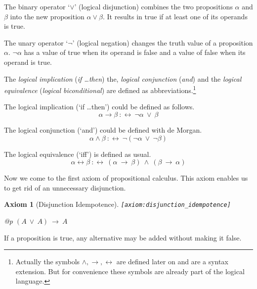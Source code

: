 \documentclass[a4paper,german,10pt,twoside]{book}
\newtheorem{ax}{Axiom}
\theoremstyle{definition}
\theoremstyle{remark}
\begin{document}
The binary operator \mbox{`$\vee$'} (logical disjunction) combines the two propositions $\alpha$ and $\beta$ into the new proposition $\alpha \vee \beta$. It results in true if at least one of its operands is true.

\par
The unary operator \mbox{`$\neg$'} (logical negation) changes the truth value of a proposition $\alpha$. $\neg \alpha$ has a value of true when its operand is false and a value of false when its operand is true. 

\par
The \emph{logical implication} (\emph{if \ldots then}) the, \emph{logical conjunction} (\emph{and}) and the \emph{logical equivalence} (\emph{logical biconditional}) are defined as abbreviations.\footnote{Actually the symbols $\wedge, \rightarrow, 
\leftrightarrow$ are defined later on and are a syntax extension. But for convenience these symbols are already part of the logical language.}


The logical implication (`if \ldots then') could be defined as follows.
$$\alpha \rightarrow \beta\ :\leftrightarrow \ \neg \alpha\ \lor\ \beta$$

\par


The logical conjunction (`and') could be defined with de Morgan.
$$\alpha \land \beta\ :\leftrightarrow \ \neg (\neg \alpha\ \lor\ \neg \beta)$$


The logical equivalence (`iff') is defined as usual.
$$\alpha \leftrightarrow \beta\ :\leftrightarrow \ (\alpha\ \rightarrow\ \beta)\ \land\ (\beta\ \rightarrow\ \alpha)$$


\par
Now we come to the first axiom of propositional calculus. This axiom 
enables us to get rid of an unnecessary disjunction.

\begin{ax}[Disjunction Idempotence]
\label{axiom:disjunction_idempotence} \hypertarget{axiom:disjunction_idempotence}{}
{\tt \tiny [\verb]axiom:disjunction_idempotence]]}
\mbox{}
\begin{longtable}{{@{\extracolsep{\fill}}p{\linewidth}}}
\centering $(A\ \lor\ A)\ \rightarrow\ A$
\end{longtable}

\end{ax}


\par
If a proposition is true, any alternative may be added without making it false.
\end{document}

